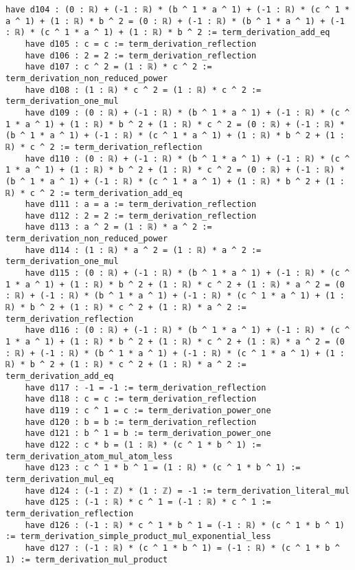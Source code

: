 \documentclass{article}
\begin{document}
\begin{tcolorbox}[colback=white!10, width=\linewidth]
\begin{lstlisting}[language=Lean4]
    have d104 : (0 : ℝ) + (-1 : ℝ) * (b ^ 1 * a ^ 1) + (-1 : ℝ) * (c ^ 1 * a ^ 1) + (1 : ℝ) * b ^ 2 = (0 : ℝ) + (-1 : ℝ) * (b ^ 1 * a ^ 1) + (-1 : ℝ) * (c ^ 1 * a ^ 1) + (1 : ℝ) * b ^ 2 := term_derivation_add_eq
    have d105 : c = c := term_derivation_reflection
    have d106 : 2 = 2 := term_derivation_reflection
    have d107 : c ^ 2 = (1 : ℝ) * c ^ 2 := term_derivation_non_reduced_power
    have d108 : (1 : ℝ) * c ^ 2 = (1 : ℝ) * c ^ 2 := term_derivation_one_mul
    have d109 : (0 : ℝ) + (-1 : ℝ) * (b ^ 1 * a ^ 1) + (-1 : ℝ) * (c ^ 1 * a ^ 1) + (1 : ℝ) * b ^ 2 + (1 : ℝ) * c ^ 2 = (0 : ℝ) + (-1 : ℝ) * (b ^ 1 * a ^ 1) + (-1 : ℝ) * (c ^ 1 * a ^ 1) + (1 : ℝ) * b ^ 2 + (1 : ℝ) * c ^ 2 := term_derivation_reflection
    have d110 : (0 : ℝ) + (-1 : ℝ) * (b ^ 1 * a ^ 1) + (-1 : ℝ) * (c ^ 1 * a ^ 1) + (1 : ℝ) * b ^ 2 + (1 : ℝ) * c ^ 2 = (0 : ℝ) + (-1 : ℝ) * (b ^ 1 * a ^ 1) + (-1 : ℝ) * (c ^ 1 * a ^ 1) + (1 : ℝ) * b ^ 2 + (1 : ℝ) * c ^ 2 := term_derivation_add_eq
    have d111 : a = a := term_derivation_reflection
    have d112 : 2 = 2 := term_derivation_reflection
    have d113 : a ^ 2 = (1 : ℝ) * a ^ 2 := term_derivation_non_reduced_power
    have d114 : (1 : ℝ) * a ^ 2 = (1 : ℝ) * a ^ 2 := term_derivation_one_mul
    have d115 : (0 : ℝ) + (-1 : ℝ) * (b ^ 1 * a ^ 1) + (-1 : ℝ) * (c ^ 1 * a ^ 1) + (1 : ℝ) * b ^ 2 + (1 : ℝ) * c ^ 2 + (1 : ℝ) * a ^ 2 = (0 : ℝ) + (-1 : ℝ) * (b ^ 1 * a ^ 1) + (-1 : ℝ) * (c ^ 1 * a ^ 1) + (1 : ℝ) * b ^ 2 + (1 : ℝ) * c ^ 2 + (1 : ℝ) * a ^ 2 := term_derivation_reflection
    have d116 : (0 : ℝ) + (-1 : ℝ) * (b ^ 1 * a ^ 1) + (-1 : ℝ) * (c ^ 1 * a ^ 1) + (1 : ℝ) * b ^ 2 + (1 : ℝ) * c ^ 2 + (1 : ℝ) * a ^ 2 = (0 : ℝ) + (-1 : ℝ) * (b ^ 1 * a ^ 1) + (-1 : ℝ) * (c ^ 1 * a ^ 1) + (1 : ℝ) * b ^ 2 + (1 : ℝ) * c ^ 2 + (1 : ℝ) * a ^ 2 := term_derivation_add_eq
    have d117 : -1 = -1 := term_derivation_reflection
    have d118 : c = c := term_derivation_reflection
    have d119 : c ^ 1 = c := term_derivation_power_one
    have d120 : b = b := term_derivation_reflection
    have d121 : b ^ 1 = b := term_derivation_power_one
    have d122 : c * b = (1 : ℝ) * (c ^ 1 * b ^ 1) := term_derivation_atom_mul_atom_less
    have d123 : c ^ 1 * b ^ 1 = (1 : ℝ) * (c ^ 1 * b ^ 1) := term_derivation_mul_eq
    have d124 : (-1 : ℤ) * (1 : ℤ) = -1 := term_derivation_literal_mul
    have d125 : (-1 : ℝ) * c ^ 1 = (-1 : ℝ) * c ^ 1 := term_derivation_reflection
    have d126 : (-1 : ℝ) * c ^ 1 * b ^ 1 = (-1 : ℝ) * (c ^ 1 * b ^ 1) := term_derivation_simple_product_mul_exponential_less
    have d127 : (-1 : ℝ) * (c ^ 1 * b ^ 1) = (-1 : ℝ) * (c ^ 1 * b ^ 1) := term_derivation_mul_product

\end{lstlisting}
\end{tcolorbox}
\end{document}

